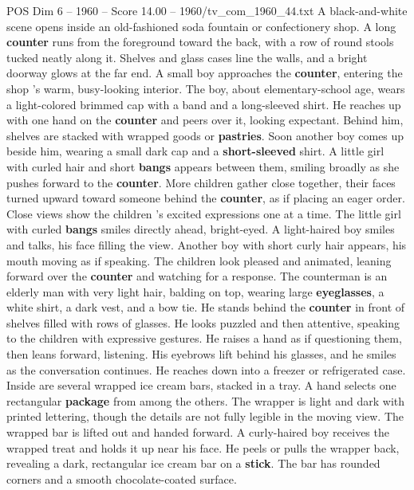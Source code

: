 \begin{textsample}{POS Dim 6 – 1960 – Score 14.00 – 1960/tv\_com\_1960\_44.txt}  \label{ex:f6_pos_025}
A black-and-white scene opens inside an old-fashioned soda fountain or confectionery shop.
A long \textbf{counter} runs from the foreground toward the back, with a row of round stools tucked neatly along it.
Shelves and glass cases line the walls, and a bright doorway glows at the far end.
A small boy approaches the \textbf{counter}, entering the shop ’s warm, busy-looking interior.
The boy, about elementary-school age, wears a light-colored brimmed cap with a band and a long-sleeved shirt.
He reaches up with one hand on the \textbf{counter} and peers over it, looking expectant.
Behind him, shelves are stacked with wrapped goods or \textbf{pastries}.
Soon another boy comes up beside him, wearing a small dark cap and a \textbf{short-sleeved} shirt.
A little girl with curled hair and short \textbf{bangs} appears between them, smiling broadly as she pushes forward to the \textbf{counter}.
More children gather close together, their faces turned upward toward someone behind the \textbf{counter}, as if placing an eager order.
Close views show the children ’s excited expressions one at a time.
The little girl with curled \textbf{bangs} smiles directly ahead, bright-eyed.
A light-haired boy smiles and talks, his face filling the view.
Another boy with short curly hair appears, his mouth moving as if speaking.
The children look pleased and animated, leaning forward over the \textbf{counter} and watching for a response.
The counterman is an elderly man with very light hair, balding on top, wearing large \textbf{eyeglasses}, a white shirt, a dark vest, and a bow tie.
He stands behind the \textbf{counter} in front of shelves filled with rows of glasses.
He looks puzzled and then attentive, speaking to the children with expressive gestures.
He raises a hand as if questioning them, then leans forward, listening.
His eyebrows lift behind his glasses, and he smiles as the conversation continues.
He reaches down into a freezer or refrigerated case.
Inside are several wrapped ice cream bars, stacked in a tray.
A hand selects one rectangular \textbf{package} from among the others.
The wrapper is light and dark with printed lettering, though the details are not fully legible in the moving view.
The wrapped bar is lifted out and handed forward.
A curly-haired boy receives the wrapped treat and holds it up near his face.
He peels or pulls the wrapper back, revealing a dark, rectangular ice cream bar on a \textbf{stick}.
The bar has rounded corners and a smooth chocolate-coated surface.

\end{textsample}
